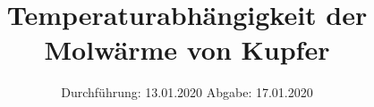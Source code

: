 
\usepackage{longtable}
\usepackage{wrapfig}
\usepackage{ dsfont }
\subject{VERSUCH 47}
\title{Temperaturabhängigkeit der Molwärme von Kupfer}
\date{%
  \hspace{-2.5em}
  Durchführung: 13.01.2020
  \hspace{4em}
  Abgabe: 17.01.2020
}


  \setlength{\parindent}{0em}
  \maketitle
  \thispagestyle{empty}
  \newpage
  \tableofcontents
  \newpage





\printbibliography{}
%



